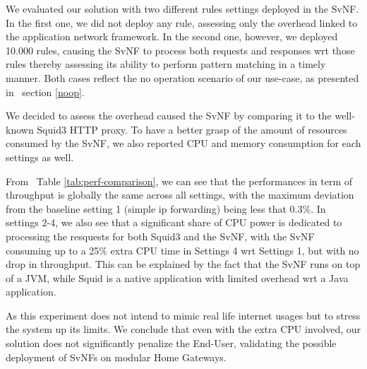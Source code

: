 We evaluated our solution with two different rules settings deployed in the SvNF. In the first one, we did not deploy any rule, assessing only the overhead linked to the application network framework. In the second one, however, we deployed 10.000 rules, causing the SvNF to process both requests and responses wrt those rules thereby assessing its ability to perform pattern matching in a timely manner. Both cases reflect the no operation scenario of our use-case, as  presented in ~section \ref{noop}.

We decided to assess the overhead caused the SvNF by comparing it to the well-known Squid3 HTTP proxy. To have a better grasp of the amount of resources consumed by the SvNF, we also reported CPU and memory consumption for each settings as well.

From ~Table \ref{tab:perf-comparison}, we can see that the performances in term of throughput is globally the same across all settings, with the maximum deviation from the baseline setting 1 (simple ip forwarding) being less that 0.3\%.
In settings 2-4, we also see that a significant share of CPU power is dedicated to processing the resquests for both Squid3 and the SvNF, with the SvNF consuming up to a 25\% extra CPU time in Settings 4 wrt Settings 1, but with no drop in throughput. This can be explained by the fact that the SvNF runs on top of a JVM, while Squid is a native application with limited overhead wrt a Java application.

As this experiment does not intend to mimic real life internet usages but to stress the system up its limits.
We conclude that even with the extra CPU involved, our solution does not significantly penalize the End-User, validating the possible deployment of SvNFs on modular Home Gateways.

